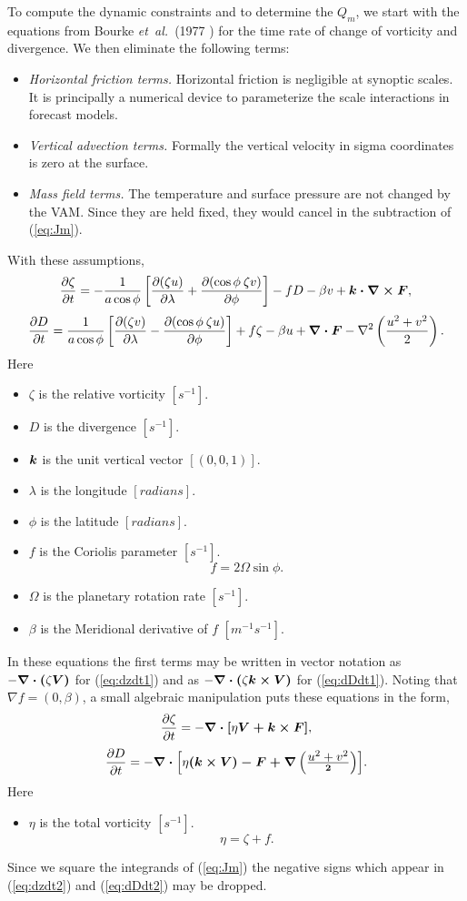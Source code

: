 \documentclass[11pt]{article}
\newcommand{\Cross}[2]{\Vector{{#1} \times {#2}}}
\newcommand{\Dot}[2]{\Vector{{#1} \cdot {#2}}}
\newcommand{\etal}{{\em et~al.}}
\newcommand{\vam}{VAM}
\newcommand{\Vector}[1]{\mbox{\boldmath ${#1}$}}
\newcommand{\reference}[2]{(#1 \cite{#2})}
\newcommand{\eql}[2]{\begin{equation} \label{eq:#1} #2 \end{equation}}
\newcommand{\eqr}[1]{(\ref{eq:#1})}
\newcommand{\vardef}[3]{\item $ {#1} $ is the {#2} $ [{#3}] $. }
\newcommand{\DpDp}[2]{ \frac{\partial #1}{\partial #2} }
\newcommand{\Scalar}[1]{\mbox{\unboldmath $ {#1} $}}
\begin{document}
To compute the dynamic constraints and to determine the $Q_m$, we
start with the equations from Bourke \etal\ \reference{1977}{BouMP+77}
for the time rate of change of vorticity and divergence.  We then
eliminate the following terms:
 \begin{itemize}
 \item {\em Horizontal friction terms.} Horizontal friction is negligible at
synoptic scales.  It is principally a numerical device to parameterize
the scale interactions in forecast models.
 \item {\em Vertical advection terms.}  Formally the vertical velocity in
sigma coordinates is zero at the surface.
 \item {\em Mass field terms.}  The temperature and surface pressure
are not changed by the \vam.  Since they are held fixed, they would
cancel in the subtraction of \eqr{Jm}.
 \end{itemize}
 With these assumptions,
 \eql{dzdt1}{\DpDp{\zeta}{t} = -\frac{1}{a \cos \phi} \left[
   \DpDp{ (\zeta u) }{\lambda} + \DpDp{ (\cos \phi \: \zeta v) }{\phi} \right]
   - f D - \beta v + \Dot{k}{\Cross{\nabla}{F}} , }
 \eql{dDdt1}{\DpDp{D}{t} = \frac{1}{a \cos \phi} \left[
   \DpDp{ (\zeta v) }{\lambda} - \DpDp{ (\cos \phi \: \zeta u) }{\phi} \right]
   + f \zeta - \beta u + \Dot{\nabla}{F}
   - \nabla^2 \left( \frac{u^2 + v^2}{2} \right) . }
 Here \begin{itemize}
  \vardef{\zeta}{relative vorticity}{s^{-1}}
  \vardef{D}{divergence}{s^{-1}}
  \vardef{\Vector{k}}{unit vertical vector}{(0,0,1)}
  \vardef{\lambda}{longitude}{radians}
  \vardef{\phi}{latitude}{radians}
  \vardef{f}{Coriolis parameter}{s^{-1}}
   \eql{f}{ f = 2 \Omega \sin \phi . }
  \vardef{\Omega}{planetary rotation rate}{s^{-1}}
  \vardef{\beta}{Meridional derivative of $f$}{m^{-1}s^{-1}}
 \end{itemize} 
 In these equations the first terms may be written in vector notation
as $ - \Dot{\nabla}{(\Scalar{\zeta} {V})} $ for \eqr{dzdt1} and
as $ - \Dot{\nabla}{(\Scalar{\zeta} \Cross{k}{V})} $ for
\eqr{dDdt1}.  Noting that $ \nabla f = (0, \beta) $, a small algebraic
manipulation puts these equations in the form,
 \eql{dzdt2}{\DpDp{\zeta}{t} = - \Dot{\nabla}{\left[\Scalar{\eta} {V} +
\Cross{k}{F}\right]} , }
 \eql{dDdt2}{\DpDp{D}{t} = - \Dot{\nabla}{\left[\Scalar{\eta}
  (\Cross{k}{V}) - F +
  \nabla \left( \frac{\Scalar{u^2 + v^2}}{2} \right)\right]} . }
 Here \begin{itemize}
  \vardef{\eta}{total vorticity}{s^{-1}}
   \eql{eta}{ \eta = \zeta + f . }
 \end{itemize} 
 Since we square the integrands of \eqr{Jm} the negative signs which
appear in \eqr{dzdt2} and \eqr{dDdt2} may be dropped.
\end{document}
